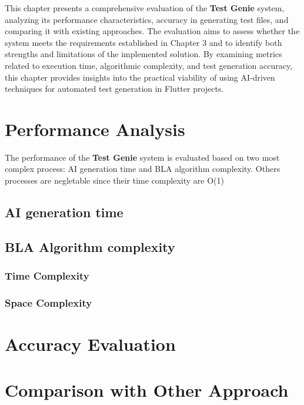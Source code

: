 This chapter presents a comprehensive evaluation of the \textbf{Test Genie} system, analyzing its performance characteristics, accuracy in generating test files, and comparing it with existing approaches. The evaluation aims to assess whether the system meets the requirements established in Chapter 3 and to identify both strengths and limitations of the implemented solution. By examining metrics related to execution time, algorithmic complexity, and test generation accuracy, this chapter provides insights into the practical viability of using AI-driven techniques for automated test generation in Flutter projects.

\section{Performance Analysis}

The performance of the \textbf{Test Genie} system is evaluated based on two most complex process: AI generation time and BLA algorithm complexity. Others processes are negletable since their time complexity are O(1)

\subsection{AI generation time}

\subsection{BLA Algorithm complexity}

\subsubsection{Time Complexity}

\subsubsection{Space Complexity}

\section{Accuracy Evaluation}


\section{Comparison with Other Approach}